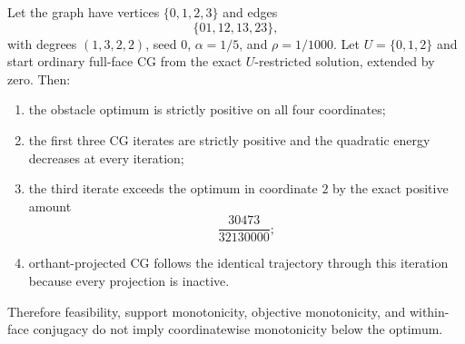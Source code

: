 \begin{theorem}
\label{thm:cg-counterexample}
Let the graph have vertices $\{0,1,2,3\}$ and edges
\begin{equation}
 \{01,12,13,23\},
 \label{eq:counterexample-graph}
\end{equation}
with degrees $(1,3,2,2)$, seed $0$, $\alpha=1/5$, and $\rho=1/1000$.
Let $U=\{0,1,2\}$ and start ordinary full-face CG from the exact
$U$-restricted solution, extended by zero.  Then:
\begin{enumerate}[label=(\roman*)]
\item the obstacle optimum is strictly positive on all four coordinates;
\item the first three CG iterates are strictly positive and the quadratic
energy decreases at every iteration;
\item the third iterate exceeds the optimum in coordinate $2$ by the exact
positive amount
\begin{equation}
 \frac{30473}{32130000};
 \label{eq:overshoot}
\end{equation}
\item orthant-projected CG follows the identical trajectory through this
iteration because every projection is inactive.
\end{enumerate}
Therefore feasibility, support monotonicity, objective monotonicity, and
within-face conjugacy do not imply coordinatewise monotonicity below the
optimum.
\end{theorem}

